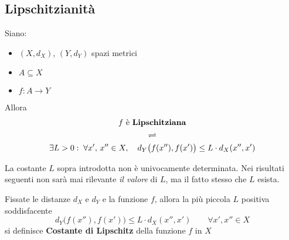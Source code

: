 \subsection{Lipschitzianità}
\begin{definition}
	\label{def:lips}
	Siano:
	\begin{itemize}[noitemsep]
		\item $(X,d_X)$, $(Y,d_Y)$ spazi metrici
		\item $A \subseteq X$
		\item $f:A \to Y$
	\end{itemize}
	Allora
	\begin{equation*}
		\begin{gathered}
			f \text{ è \textbf{Lipschitziana}}\\
			\rightleftharpoons\\
			\exists L > 0:\; \forall x',\,x'' \in X, \quad d_Y\bigl(f(x''),f(x')\bigr) \leq L \cdot d_X(x'',x')
		\end{gathered}
	\end{equation*}
	\begin{note}
		La costante $L$ sopra introdotta non è univocamente determinata. Nei risultati seguenti non sarà mai rilevante \textit{il valore} di $L$, ma il fatto stesso che $L$ esista.
	\end{note}
\end{definition}
\begin{definition}
	\label{def:cost_lips}
	Fissate le distanze $d_X$ e $d_Y$ e la funzione $f$, allora la più piccola $L$ positiva soddisfacente
	\[d_Y\bigl(f(x''),f(x')\bigr)\leq L \cdot d_X(x'',x') \qquad \forall x',x'' \in X\]
	si definisce \textbf{Costante di Lipschitz} della funzione $f$ in $X$
\end{definition}
